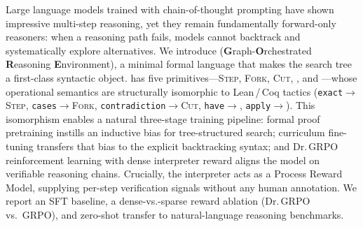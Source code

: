 Large language models trained with chain-of-thought prompting have shown
impressive multi-step reasoning, yet they remain fundamentally forward-only
reasoners: when a reasoning path fails, models cannot backtrack and
systematically explore alternatives.
We introduce \gore{} (\textbf{G}raph-\textbf{O}rchestrated \textbf{R}easoning
\textbf{E}nvironment), a minimal formal language that makes the search tree a
first-class syntactic object.
\gore{} has five primitives---\textsc{Step}, \textsc{Fork}, \textsc{Cut},
, and \callstmt{}---whose operational semantics are structurally
isomorphic to Lean\,/\,Coq tactics (\texttt{exact}$\to$\textsc{Step},
\texttt{cases}$\to$\textsc{Fork}, \texttt{contradiction}$\to$\textsc{Cut},
\texttt{have}$\to$, \texttt{apply}$\to$\callstmt{}).
This isomorphism enables a natural three-stage training pipeline: formal proof
pretraining instills an inductive bias for tree-structured search;
\gore{} curriculum fine-tuning transfers that bias to the explicit backtracking
syntax; and Dr.\,GRPO reinforcement learning with dense interpreter reward
aligns the model on verifiable reasoning chains.
Crucially, the \gore{} interpreter acts as a Process Reward Model, supplying
per-step verification signals without any human annotation.
We report an SFT baseline, a dense-vs.-sparse reward ablation (Dr.\,GRPO
vs.\ GRPO), and zero-shot transfer to natural-language reasoning benchmarks.
